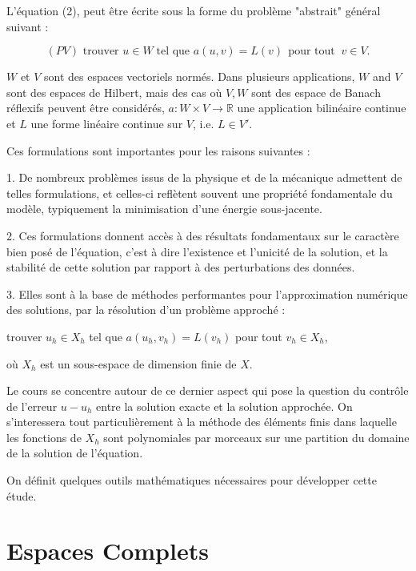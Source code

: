 L'équation (2),  peut être écrite sous la forme du problème "abstrait" général suivant :

$$
(PV) \text{ trouver } u \in W\;  \text{tel que } a(u, v)=L(v) \;\, \text{pour tout}\;\;  v \in V.
$$

 $W$ et  $V$ sont des espaces vectoriels normés. Dans plusieurs applications, $W$ and $V$ sont des espaces de Hilbert, mais  des cas où $V, W$ sont des  espace de  Banach  réflexifs  peuvent être considérés, $a:W\times V\longrightarrow \mathbb{R}$ une application bilinéaire continue
et $L$ une forme linéaire continue sur $V$, i.e. $L\in V'$. 

Ces formulations sont importantes pour les raisons suivantes :

1. De nombreux problèmes issus de la physique et de la mécanique admettent de telles formulations, et celles-ci reflètent souvent une propriété fondamentale du modèle, typiquement la minimisation d'une énergie sous-jacente.

2. Ces formulations donnent accès à des résultats fondamentaux sur le caractère bien posé de l'équation, c'est à dire l'existence et l'unicité de la solution, et la stabilité de cette solution par rapport à des perturbations des données.

3. Elles sont à la base de méthodes performantes pour l'approximation numérique des solutions, par la résolution d'un problème approché : 
\bigskip

\centerline{
trouver $u_{h} \in X_{h}$ tel que $a\left(u_{h}, v_{h}\right)=L\left(v_{h}\right)$ pour tout $v_{h} \in X_{h}$,} 

où $X_{h}$ est un sous-espace de dimension finie de $X$.

Le cours se concentre autour de ce dernier aspect qui pose la question du contrôle de l'erreur $u-u_{h}$ entre la solution exacte et la solution approchée. On s'interessera tout particulièrement à la méthode des éléments finis dans laquelle les fonctions de $X_{h}$ sont polynomiales par morceaux sur une partition du domaine de la solution de l'équation.


On définit quelques outils mathématiques nécessaires pour développer cette étude.

\section{Espaces Complets}


